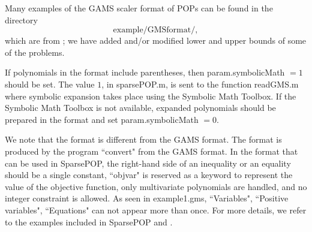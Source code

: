 Many examples of the GAMS scaler format of POPs can be found in the directory 
\[
\mbox{example/GMSformat/}, 
\]
which are from \cite{GLOBAL}; we have added and/or modified lower and upper bounds of some 
of the problems. 

If polynomials in the \GMS format include parentheses, then
 {\sf param.symbolicMath} $= 1$ should be set.   The value $1$, in sparsePOP.m, is sent 
 to  the function readGMS.m where symbolic expansion takes place using the Symbolic Math 
Toolbox. If the Symbolic Math Toolbox 
is not available, %
expanded polynomials should be prepared in the \GMS format and 
set {\sf param.symbolicMath} $= 0$. 

We note that the  \GMS format is different from the GAMS format.
The \GMS format is produced by the program ``convert" from the GAMS  format. In the \GMS format
that can be used in SparsePOP,
the right-hand side of an inequality or an equality should be a single constant, 
``objvar" is reserved as a keyword to represent the value of the objective function,
 only multivariate polynomials are handled, and
no integer constraint is allowed. As seen in example1.gms, ``Variables", ``Positive variables",
``Equations" can not appear more than once. For more details, we refer to the 
examples included in SparsePOP and \cite{GAMS}.



